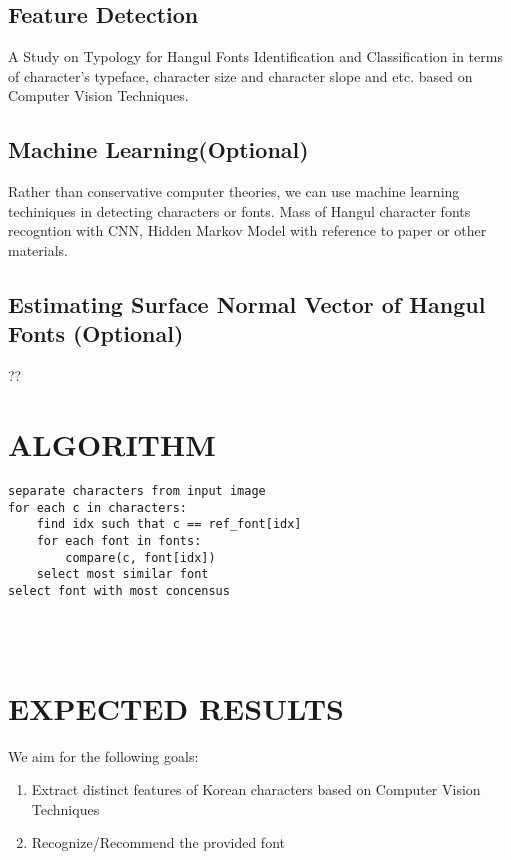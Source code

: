 \documentclass[%
 reprint,
nofootinbib,
nobibnotes,
amsmath,amssymb,
aps,
]{revtex4-1}
\begin{document}
\subsection{\label{sec:level3} Feature Detection}
A Study on Typology for Hangul Fonts Identification and Classification in
terms of character's typeface, character size and character slope and etc.
based on Computer Vision Techniques.

\subsection{\label{sec:level3} Machine Learning(Optional)}
Rather than conservative computer theories, we can use machine learning techiniques
in detecting characters or fonts.
Mass of Hangul character fonts recogntion with CNN, Hidden Markov Model with
reference to paper\cite{tensmeyer} or other materials.

\subsection{\label{sec:level3} Estimating Surface Normal Vector of Hangul
Fonts (Optional)}
??

\pagebreak
\section{\label{sec:level3} ALGORITHM}

\begin{lstlisting}
separate characters from input image
for each c in characters:
	find idx such that c == ref_font[idx]
	for each font in fonts:
		compare(c, font[idx])
	select most similar font
select font with most concensus
		
		
	
\end{lstlisting}


\section{\label{sec:level2}EXPECTED RESULTS}
We aim for the following goals:
\begin{enumerate}[topsep=0pt, itemsep=-1ex, partopsep=1ex, parsep=1ex]
  \item Extract distinct features of Korean characters based on Computer Vision
    Techniques
  \item Recognize/Recommend the provided font

\end{enumerate}
\end{document}
